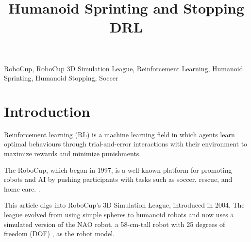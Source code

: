 \documentclass[conference]{IEEEtran}
\begin{document}
\title{Humanoid Sprinting and Stopping DRL}

\author{

    \and

    \and

}


\maketitle

\begin{abstract}

\end{abstract}

\begin{IEEEkeywords}
    RoboCup, RoboCup 3D Simulation League, Reinforcement Learning, Humanoid Sprinting, Humanoid Stopping, Soccer
\end{IEEEkeywords}

\section{Introduction}

Reinforcement learning (RL) is a machine learning field in which agents learn optimal behaviours through trial-and-error interactions with their environment to maximize rewards and minimize punishments.

The RoboCup, which began in 1997, is a well-known platform for promoting robots and AI by pushing participants with tasks such as soccer, rescue, and home care. \cite{robocup97}.

This article digs into RoboCup's 3D Simulation League, introduced in 2004. The league evolved from using simple spheres to humanoid robots and now uses a simulated version of the NAO robot, a 58-cm-tall robot with 25 degrees of freedom (DOF) \cite{naorobot}, as the robot model.
\end{document}
